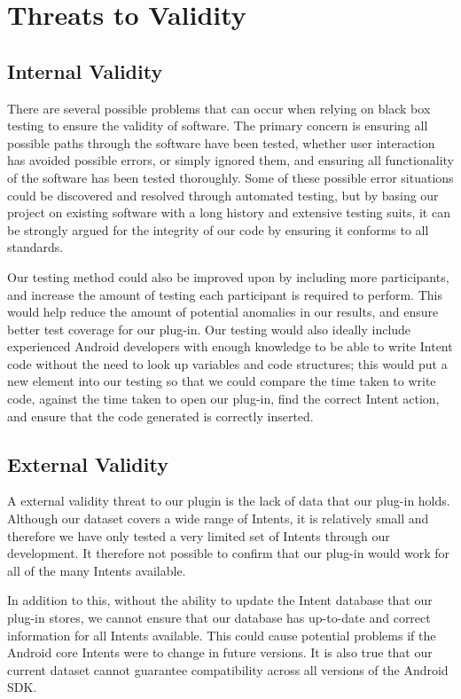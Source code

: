 \section{Threats to Validity}

\subsection{Internal Validity}
There are several possible problems that can occur when relying on black box testing to ensure the validity of software. The primary concern is ensuring all possible paths through the software have been tested, whether user interaction has avoided possible errors, or simply ignored them, and ensuring all functionality of the software has been tested thoroughly. Some of these possible error situations could be discovered and resolved through automated testing, but by basing our project on existing software with a long history and extensive testing suits, it can be strongly argued for the integrity of our code by ensuring it conforms to all standards.

Our testing method could also be improved upon by including more participants, and increase the amount of testing each participant is required to perform. This would help reduce the amount of potential anomalies in our results, and ensure better test coverage for our plug-in. Our testing would also ideally include experienced Android developers with enough knowledge to be able to write Intent code without the need to look up variables and code structures; this would put a new element into our testing so that we could compare the time taken to write code, against the time taken to open our plug-in, find the correct Intent action, and ensure that the code generated is correctly inserted.


\subsection{External Validity}

A external validity threat to our plugin is the lack of data that our plug-in holds. Although our dataset covers a wide range of Intents, it is relatively small and therefore we have only tested a very limited set of Intents through our development. It therefore not possible to confirm that our plug-in would work for all of the many Intents available.

In addition to this, without the ability to update the Intent database that our plug-in stores, we cannot ensure that our database has up-to-date and correct information for all Intents available. This could cause potential problems if the Android core Intents were to change in future versions. It is also true that our current dataset cannot guarantee compatibility across all versions of the Android SDK.